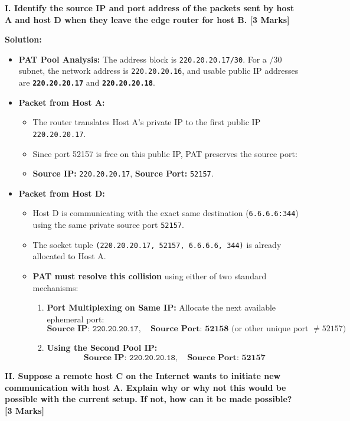\documentclass[11pt,a4paper]{article}
\begin{document}
\textbf{I. Identify the source IP and port address of the packets sent by host A and host D when they leave the edge router for host B. [3 Marks]}

\textbf{Solution:}
\begin{itemize}
    \item \textbf{PAT Pool Analysis:} The address block is \texttt{220.20.20.17/30}. For a $/30$ subnet, the network address is \texttt{220.20.20.16}, and usable public IP addresses are \textbf{\texttt{220.20.20.17}} and \textbf{\texttt{220.20.20.18}}.
    \item \textbf{Packet from Host A:}
    \begin{itemize}
        \item The router translates Host A's private IP to the first public IP \texttt{220.20.20.17}.
        \item Since port 52157 is free on this public IP, PAT preserves the source port:
        \item \textbf{Source IP:} \texttt{220.20.20.17}, \textbf{Source Port:} \texttt{52157}.
    \end{itemize}
    \item \textbf{Packet from Host D:}
    \begin{itemize}
        \item Host D is communicating with the exact same destination (\texttt{6.6.6.6:344}) using the same private source port \texttt{52157}.
        \item The socket tuple \texttt{(220.20.20.17, 52157, 6.6.6.6, 344)} is already allocated to Host A.
        \item \textbf{PAT must resolve this collision} using either of two standard mechanisms:
        \begin{enumerate}
            \item \textbf{Port Multiplexing on Same IP:} Allocate the next available ephemeral port:
            \[
            \textbf{Source IP: } \texttt{220.20.20.17}, \quad \textbf{Source Port: } \mathbf{52158} \text{ (or other unique port } \ne 52157)
            \]
            \item \textbf{Using the Second Pool IP:}
            \[
            \textbf{Source IP: } \texttt{220.20.20.18}, \quad \textbf{Source Port: } \mathbf{52157}
            \]
        \end{enumerate}
    \end{itemize}
\end{itemize}

\vspace{0.2cm}
\textbf{II. Suppose a remote host C on the Internet wants to initiate new communication with host A. Explain why or why not this would be possible with the current setup. If not, how can it be made possible? [3 Marks]}
\end{document}
